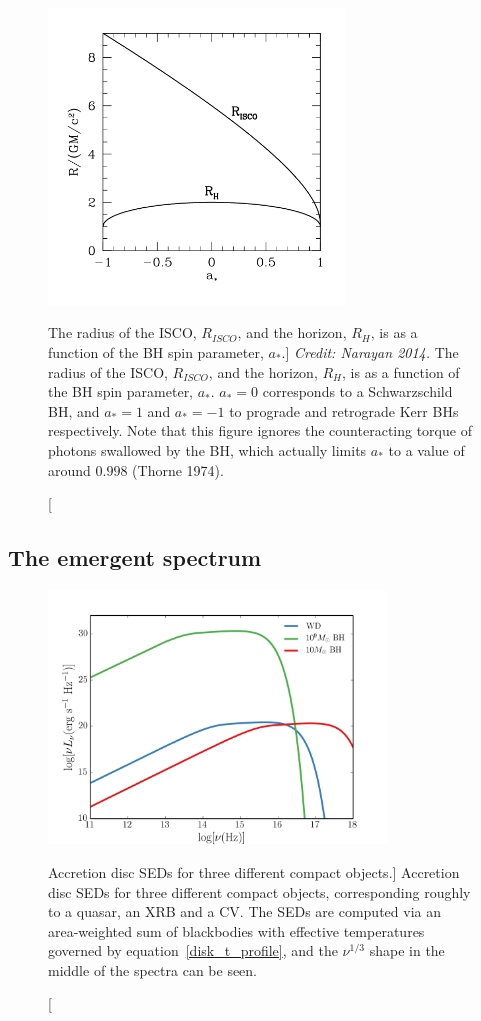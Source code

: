 \nocite{narayan2014, thorne1974}
\begin{figure}
\centering
\includegraphics[width=0.7\textwidth]{figures/01-intro/isco.png}
\caption
[The radius of the ISCO, $R_{ISCO}$, and the horizon, $R_H$,
is as a function of the BH spin parameter, $a_*$.]
{
{\sl Credit: Narayan 2014.}
The radius of the ISCO, $R_{ISCO}$, and the horizon, $R_H$,
is as a function of the BH spin parameter, $a_*$. 
$a_*=0$ corresponds to a Schwarzschild BH, and $a_*=1$ and $a_*=-1$
to prograde and retrograde Kerr BHs respectively. Note that
this figure ignores the counteracting torque of photons swallowed by the BH,
which actually limits $a_*$ to a value of around $0.998$ (Thorne 1974).  
} 
\label{fig:isco}
\end{figure}


\subsection{The emergent spectrum}


\begin{figure}
\centering
\includegraphics[width=0.8\textwidth]{figures/01-intro/disc_seds.png}
\caption
[Accretion disc SEDs for three different compact objects.]
{
Accretion disc SEDs for three different compact objects, corresponding roughly
to a quasar, an XRB and a CV. The SEDs are computed via an area-weighted sum
of blackbodies with effective temperatures governed by equation~\ref{disk_t_profile},
and the $\nu^{1/3}$ shape in the middle of the spectra can be seen.
} 
\label{fig:disc_seds}
\end{figure}

